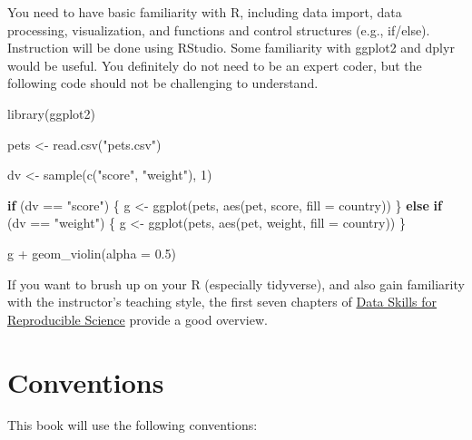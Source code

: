\documentclass[
  oneside]{book}
\newenvironment{Shaded}{\begin{snugshade}}{\end{snugshade}}
\newcommand{\AttributeTok}[1]{\textcolor[rgb]{0.77,0.63,0.00}{#1}}
\newcommand{\ControlFlowTok}[1]{\textcolor[rgb]{0.13,0.29,0.53}{\textbf{#1}}}
\newcommand{\DecValTok}[1]{\textcolor[rgb]{0.00,0.00,0.81}{#1}}
\newcommand{\FloatTok}[1]{\textcolor[rgb]{0.00,0.00,0.81}{#1}}
\newcommand{\FunctionTok}[1]{\textcolor[rgb]{0.00,0.00,0.00}{#1}}
\newcommand{\NormalTok}[1]{#1}
\newcommand{\OtherTok}[1]{\textcolor[rgb]{0.56,0.35,0.01}{#1}}
\newcommand{\SpecialCharTok}[1]{\textcolor[rgb]{0.00,0.00,0.00}{#1}}
\newcommand{\StringTok}[1]{\textcolor[rgb]{0.31,0.60,0.02}{#1}}
\begin{document}
You need to have basic familiarity with R, including data import, data processing, visualization, and functions and control structures (e.g., if/else). Instruction will be done using RStudio. Some familiarity with ggplot2 and dplyr would be useful. You definitely do not need to be an expert coder, but the following code should not be challenging to understand.

\begin{Shaded}
\begin{Highlighting}[]
\FunctionTok{library}\NormalTok{(ggplot2)}

\NormalTok{pets }\OtherTok{\textless{}{-}} \FunctionTok{read.csv}\NormalTok{(}\StringTok{"pets.csv"}\NormalTok{)}

\NormalTok{dv }\OtherTok{\textless{}{-}} \FunctionTok{sample}\NormalTok{(}\FunctionTok{c}\NormalTok{(}\StringTok{"score"}\NormalTok{, }\StringTok{"weight"}\NormalTok{), }\DecValTok{1}\NormalTok{)}

\ControlFlowTok{if}\NormalTok{ (dv }\SpecialCharTok{==} \StringTok{"score"}\NormalTok{) \{}
\NormalTok{    g }\OtherTok{\textless{}{-}} \FunctionTok{ggplot}\NormalTok{(pets, }\FunctionTok{aes}\NormalTok{(pet, score, }\AttributeTok{fill =}\NormalTok{ country))}
\NormalTok{\} }\ControlFlowTok{else} \ControlFlowTok{if}\NormalTok{ (dv }\SpecialCharTok{==} \StringTok{"weight"}\NormalTok{) \{}
\NormalTok{    g }\OtherTok{\textless{}{-}} \FunctionTok{ggplot}\NormalTok{(pets, }\FunctionTok{aes}\NormalTok{(pet, weight, }\AttributeTok{fill =}\NormalTok{ country))}
\NormalTok{\}}

\NormalTok{g }\SpecialCharTok{+} \FunctionTok{geom\_violin}\NormalTok{(}\AttributeTok{alpha =} \FloatTok{0.5}\NormalTok{)}
\end{Highlighting}
\end{Shaded}

If you want to brush up on your R (especially tidyverse), and also gain familiarity with the instructor's teaching style, the first seven chapters of \href{https://psyteachr.github.io/msc-data-skills/}{Data Skills for Reproducible Science} provide a good overview.

\hypertarget{conventions}{%
\section{Conventions}\label{conventions}}

This book will use the following conventions:
\end{document}
